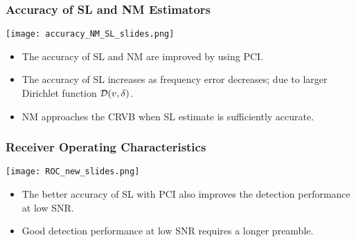\begin{frame}
  \frametitle{Accuracy of SL and NM Estimators}

    \begin{center}
      \texttt{[image: accuracy\_NM\_SL\_slides.png]}
    \end{center}

    \begin{itemize}
    
      \item The accuracy of SL and NM are improved by using PCI.
      \item The accuracy of SL increases as frequency error decreases;
        due to  larger Dirichlet function $\mathcal{D}(v,\delta)$.  
      \item NM approaches the CRVB when SL estimate is sufficiently accurate.

    \end{itemize}




\end{frame}

\begin{frame}
  \frametitle{Receiver Operating Characteristics}

    \begin{center}
      \texttt{[image: ROC\_new\_slides.png]}
    \end{center}

    \begin{itemize}
    
      \item The better accuracy of SL with PCI also improves the detection performance at low SNR.
      \item Good detection performance at low SNR requires a longer preamble.
    \end{itemize}

\end{frame}